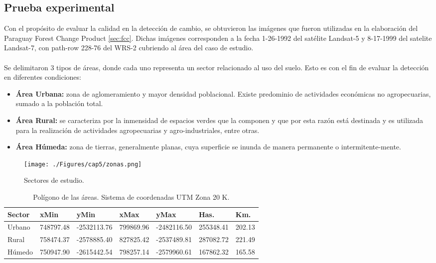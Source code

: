\subsection{Prueba experimental} 
Con el prop\'osito de evaluar la calidad en la detecci\'on de cambio, se obtuvieron las im\'agenes que fueron utilizadas en la elaboraci\'on del Paraguay Forest Change Product \ref{sec:fcc}. Dichas im\'agenes corresponden a la fecha 1-26-1992	del sat\'elite Landsat-5 y 8-17-1999 del satelite Landsat-7, con path-row 228-76 del WRS-2 cubriendo al \'area del caso de estudio.\\~\\
Se delimitaron 3 tipos de \'areas, donde cada uno representa un sector relacionado al uso del suelo. Esto es con el fin de evaluar la detecci\'on en diferentes condiciones:
\begin{itemize}
	\item \textbf{\'Area Urbana:} zona de aglomeramiento y mayor densidad poblacional. Existe predominio  de actividades econ\'omicas no agropecuarias, sumado a la poblaci\'on total. 
	\item \textbf{\'Area Rural:} se caracteriza por la inmensidad de espacios verdes que la componen y que por esta razón est\'a destinada y es utilizada para la realizaci\'on de actividades agropecuarias y agro-industriales, entre otras.
	\item \textbf{\'Area H\'umeda:}	zona de tierras, generalmente planas, cuya superficie se inunda de manera permanente o intermitente-mente.
\end{itemize}
\begin{figure}[H]
	\centering
	\texttt{[image: ./Figures/cap5/zonas.png]}
	\caption{Sectores de estudio.}
	\label{fig:zonasEva}
\end{figure}
\begin{table}[H]
	\centering
	\begin{tabular}{|l|l|l|l|l|l|l|}
		\hline
		\rowcolor[HTML]{EFEFEF} 
		\textbf{Sector} & \textbf{xMin} & \textbf{yMin} & \textbf{xMax} & \textbf{yMax} & \textbf{Has.} & \textbf{Km.} \\ \hline
		Urbano          & 748797.48     & -2532113.76   & 799869.96     & -2482116.50 & 255348.41 & 202.13   \\ \hline
		Rural           & 758474.37     & -2578885.40   & 827825.42     & -2537489.81 & 287082.72 & 221.49  \\ \hline
		Húmedo          & 750947.90     & -2615442.54   & 798257.14     & -2579960.61 & 167862.32 & 165.58	  \\ \hline
	\end{tabular}
		\caption{Pol\'igono de las \'areas. Sistema de coordenadas UTM Zona 20 K. }
		\label{t:poligonos}
\end{table}
